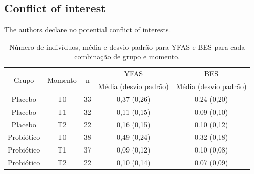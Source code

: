 \documentclass[AMA,STIX1COL]{WileyNJD-v2}
\begin{document}

\subsection*{Conflict of interest}

The authors declare no potential conflict of interests.






%

\clearpage


\begin{table}[H]
\centering
\begin{tabular}{ccccc}
\hline
\multirow{2}{*}{Grupo} & \multirow{2}{*}{Momento} & \multirow{2}{*}{n} & YFAS                  & BES                   \\ \cline{4-5} 
                       &                          &                    & Média (desvio padrão) & Média (desvio padrão) \\ \hline
Placebo                & T0                       & 33                 & 0,37 (0,26)           & 0.24 (0,20)           \\
Placebo                & T1                       & 32                 & 0,11 (0,15)           & 0.09 (0,10)           \\
Placebo                & T2                       & 22                 & 0,16 (0,15)           & 0.10 (0,12)           \\
Probiótico             & T0                       & 38                 & 0,49 (0,24)           & 0.32 (0,18)           \\
Probiótico             & T1                       & 37                 & 0,09 (0,12)           & 0.10 (0,08)           \\
Probiótico             & T2                       & 22                 & 0,10 (0,14)           & 0.07 (0,09)           \\ \hline
\end{tabular}
\caption{Número de indivíduos, média e desvio padrão para YFAS e BES para cada combinação de grupo e momento.}
\label{tab:tab1}
\end{table}
\end{document}
